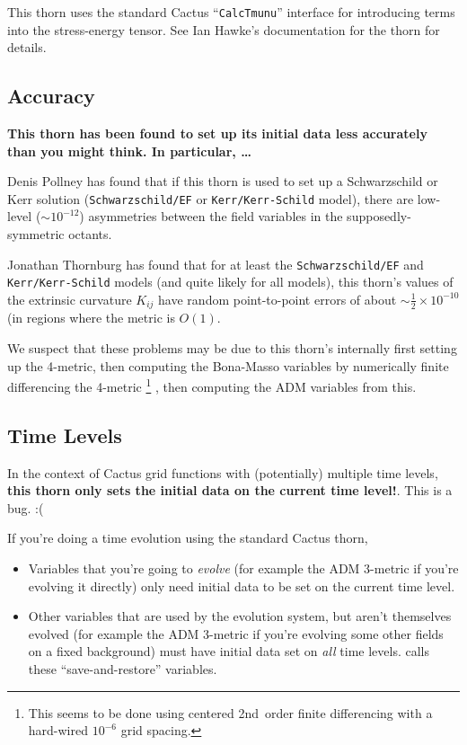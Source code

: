 This thorn uses the standard Cactus ``\verb|CalcTmunu|'' interface
for introducing terms into the stress-energy tensor.  See Ian Hawke's
documentation for the  thorn for details.


\subsection{Accuracy}

\begingroup
\bf{}
This thorn has been found to set up its initial data less accurately
than you might think.  In particular, \dots

Denis Pollney has found that if this thorn is used to set up a
Schwarzschild or Kerr solution
(\verb|Schwarzschild/EF| or \verb|Kerr/Kerr-Schild| model),
there are low-level ($\sim 10^{-12}$) asymmetries between the
field variables in the supposedly-symmetric octants.

Jonathan Thornburg has found that for at least the \verb|Schwarzschild/EF|
and \verb|Kerr/Kerr-Schild| models (and quite likely for all models),
this thorn's values of the extrinsic curvature $K_{ij}$ have random
point-to-point errors of about $\sim {\textstyle\frac{1}{2}} \times 10^{-10}$
(in regions where the metric is $O(1)$.
\endgroup

We suspect that these problems may be due to this thorn's internally
first setting up the 4-metric, then computing the Bona-Masso variables
by numerically finite differencing the 4-metric%
\footnote{%
	 This seems to be done using centered
	 2nd~order finite differencing with a
	 hard-wired $10^{-6}$ grid spacing.
	 }%
, then computing the ADM variables from this.


\subsection{Time Levels}

In the context of Cactus grid functions with (potentially) multiple
time levels,
\textbf{this thorn only sets the initial data on the current time level!}.
This is a bug. :(

If you're doing a time evolution using the standard Cactus 
thorn,
\begin{itemize}
\item	Variables that you're going to \emph{evolve}
	(for example the ADM 3-metric if you're evolving
	it directly) only need initial data to be set
	on the current time level.
\item	Other variables that are used by the evolution system,
	but aren't themselves evolved (for example the ADM 3-metric
	if you're evolving some other fields on a fixed background)
	must have initial data set on \emph{all} time levels.
	 calls these ``save-and-restore'' variables.
\end{itemize}

